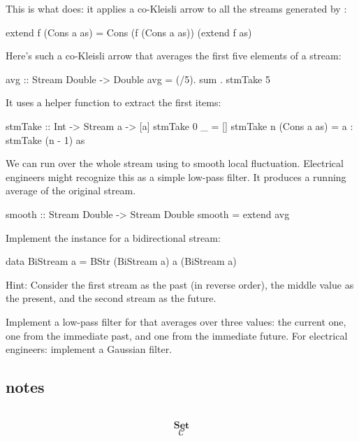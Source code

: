 \documentclass[DaoFP]{subfiles}
\begin{document}
This is what  does: it applies a co-Kleisli arrow to all the streams generated by :
\begin{haskell}
  extend f (Cons a as) = Cons (f (Cons a as)) (extend f as)
\end{haskell}
Here's such a co-Kleisli arrow that averages the first five elements of a stream:
\begin{haskell}
avg :: Stream Double -> Double
avg  = (/5). sum . stmTake 5
\end{haskell}
It uses a helper function to extract the first  items:
\begin{haskell}
stmTake :: Int -> Stream a -> [a]
stmTake 0 _ = []
stmTake n (Cons a as) = a : stmTake (n - 1) as
\end{haskell}
We can run  over the whole stream using  to smooth local fluctuation. Electrical engineers might recognize this as a simple low-pass filter. It produces a running average of the original stream. 
\begin{haskell}
smooth :: Stream Double -> Stream Double
smooth = extend avg
\end{haskell}

\begin{exercise}
Implement the  instance for a bidirectional stream:
\begin{haskell}
data BiStream a = BStr (BiStream a) a (BiStream a)
\end{haskell}
Hint: Consider the first stream as the past (in reverse order), the middle value as the present, and the second stream as the future.
\end{exercise}

\begin{exercise}
Implement a low-pass filter for  that averages over three values: the current one, one from the immediate past, and one from the immediate future. For electrical engineers: implement a Gaussian filter. 
\end{exercise}


\subsection{notes}


\begin{exercise}
\end{exercise}

\begin{haskell}
\end{haskell}

\[
 \begin{tikzcd}
  \end{tikzcd}
\]

\[   \mathbf{Set} \]
\[   \mathcal{C} \]
\end{document}
